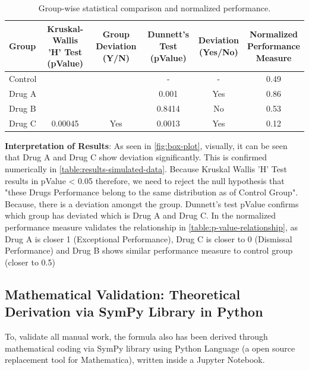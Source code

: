 \documentclass[a4paper,fleqn,review]{cas-sc}
\begin{document}
\begin{table}[!hbtp]
	\centering
	\renewcommand{\arraystretch}{1.3}
	\begin{tabular}{lccccc}
		\toprule
		\textbf{Group} &
		\makecell{\textbf{Kruskal-Wallis} \\ \textbf{'H' Test (pValue)}} &
		\makecell{\textbf{Group} \\ \textbf{Deviation (Y/N)}} &
		\makecell{\textbf{Dunnett's} \\ \textbf{Test (pValue)}} &
		\makecell{\textbf{Deviation} \\ \textbf{(Yes/No)}} &
		\makecell{\textbf{Normalized} \\ \textbf{Performance} \\ \textbf{Measure}} \\
		\midrule
		Control &         &     & -      & -    & 0.49 \\
		Drug A  &         &     & 0.001  & Yes  & 0.86 \\
		Drug B  &         &     & 0.8414 & No   & 0.53 \\
		Drug C  & \multirow{-3}{*}{0.00045} & \multirow{-3}{*}{Yes} & 0.0013 & Yes & 0.12 \\
		\bottomrule
	\end{tabular}
	\vspace{5pt}
	\caption{Group-wise statistical comparison and normalized performance.}
	\label{table:results-simulated-data}
	
\end{table}

\textbf{Interpretation of Results}:
As seen in  \autoref{fig:box-plot}, visually, it can be seen that Drug A and Drug C show deviation significantly. This is confirmed numerically in \autoref{table:results-simulated-data}. Because Kruskal Wallis 'H' Test results in pValue < 0.05 therefore, we need to reject the null hypothesis that "these Drugs Performance belong to the same distribution as of Control Group". Because, there is a deviation amongst the group. Dunnett's test pValue confirms which group has deviated which is Drug A and Drug C. In the normalized performance measure validates the relationship in \autoref{table:p-value-relationship}, as Drug A is closer 1 (Exceptional Performance), Drug C is closer to 0 (Dismissal Performance) and Drug B shows similar performance measure to control group (closer to 0.5)

\subsection{Mathematical Validation: Theoretical Derivation via SymPy Library in Python}
To, validate all manual work, the formula also has been derived through mathematical coding via SymPy library using Python Language (a open source replacement tool for Mathematica), written inside a Jupyter Notebook.
\end{document}
